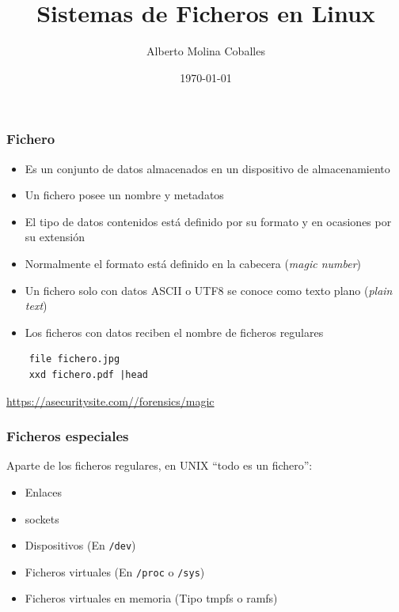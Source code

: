 \documentclass[aspectratio=169]{beamer}
\author{Alberto Molina Coballes}
\title{Sistemas de Ficheros en Linux}
\institute{IES Gonzalo Nazareno}
\date{\today}
\begin{document}
\def\braces#1{[#1]}

\begin{frame}[t,plain]
\titlepage
\end{frame}

\begin{frame}[fragile]
  \frametitle{Fichero}
  \begin{itemize}
  \item Es un conjunto de datos almacenados en un dispositivo de
    almacenamiento
  \item Un fichero posee un nombre y metadatos
  \item El tipo de datos contenidos está definido por su formato y en
    ocasiones por su extensión
  \item Normalmente el formato está definido en la cabecera
    (\textit{magic number})
  \item Un fichero solo con datos ASCII o UTF8 se conoce como texto
    plano (\textit{plain text})
  \item Los ficheros con datos reciben el nombre de ficheros regulares
  \end{itemize}
  \begin{lstlisting}
    file fichero.jpg
    xxd fichero.pdf |head
\end{lstlisting}
\small{\url{https://asecuritysite.com//forensics/magic}}
\end{frame}

\begin{frame}
  \frametitle{Ficheros especiales}
  Aparte de los ficheros regulares, en UNIX ``todo es un fichero'':
  \begin{itemize}
  \item Enlaces
  \item sockets
  \item Dispositivos (En \texttt{/dev})
  \item Ficheros virtuales (En \texttt{/proc} o \texttt{/sys})
  \item Ficheros virtuales en memoria (Tipo tmpfs o ramfs)
  \end{itemize}
\end{frame}
\end{document}
